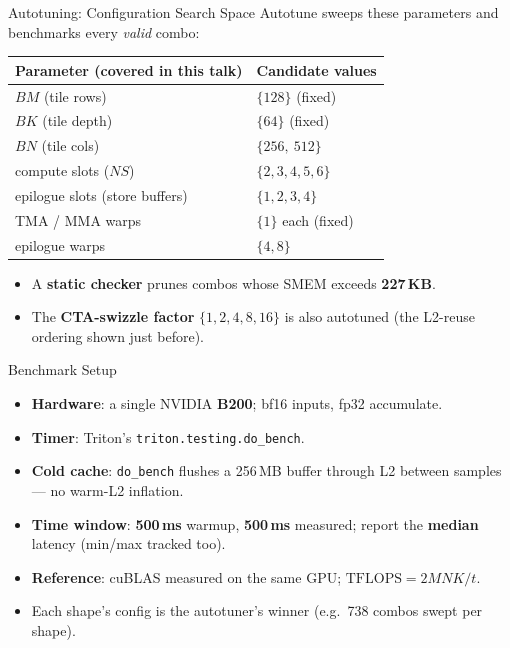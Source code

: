 \documentclass[aspectratio=169,professionalfonts]{beamer}
\newcommand{\code}[1]{\texttt{#1}}
\begin{document}
\begin{frame}{Autotuning: Configuration Search Space}
  Autotune sweeps these parameters and benchmarks every \emph{valid} combo:

  \begin{table}
    \centering\small
    \begin{tabular}{ll}
      \toprule
      Parameter (covered in this talk) & Candidate values \\
      \midrule
      $BM$ (tile rows)               & $\{128\}$ (fixed) \\
      $BK$ (tile depth)              & $\{64\}$ (fixed) \\
      $BN$ (tile cols)               & $\{256,\ 512\}$ \\
      compute slots ($NS$)           & $\{2,3,4,5,6\}$ \\
      epilogue slots (store buffers) & $\{1,2,3,4\}$ \\
      TMA / MMA warps                & $\{1\}$ each (fixed) \\
      epilogue warps                 & $\{4,8\}$ \\
      \bottomrule
    \end{tabular}
  \end{table}

  \vspace{0.1cm}
  \begin{itemize}
    \item A \textbf{static checker} prunes combos whose SMEM exceeds
      \textbf{227\,KB}.
    \item The \textbf{CTA-swizzle factor} $\{1,2,4,8,16\}$ is also autotuned
      (the L2-reuse ordering shown just before).
  \end{itemize}
\end{frame}

\begin{frame}{Benchmark Setup}
  \begin{itemize}
    \item \textbf{Hardware}: a single NVIDIA \textbf{B200}; bf16 inputs, fp32
      accumulate.
    \item \textbf{Timer}: Triton's \code{triton.testing.do\_bench}.
    \item \textbf{Cold cache}: \code{do\_bench} flushes a 256\,MB buffer through
      L2 between samples --- no warm-L2 inflation.
    \item \textbf{Time window}: \textbf{500\,ms} warmup, \textbf{500\,ms} measured;
      report the \textbf{median} latency (min/max tracked too).
    \item \textbf{Reference}: cuBLAS measured on the same GPU;
      $\text{TFLOPS} = 2MNK / t$.
    \item Each shape's config is the autotuner's winner (e.g.\ 738 combos swept
      per shape).
  \end{itemize}
\end{frame}
\end{document}
